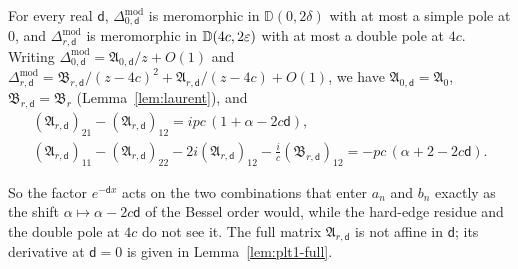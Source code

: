 \begin{lemma}\label{lem:plt1-laurent}
For every real $\mathsf d$, $\Delta^{\mathrm{mod}}_{0,\mathsf d}$ is meromorphic in $\mathbb D(0,2\delta)$ with at most a simple
pole at $0$, and $\Delta^{\mathrm{mod}}_{r,\mathsf d}$ is meromorphic in $\mathbb D(4c,2\varepsilon)$ with at most a double pole at
$4c$. Writing $\Delta^{\mathrm{mod}}_{0,\mathsf d}=\mathfrak A_{0,\mathsf d}/z+O(1)$ and
$\Delta^{\mathrm{mod}}_{r,\mathsf d}=\mathfrak B_{r,\mathsf d}/(z-4c)^2+\mathfrak A_{r,\mathsf d}/(z-4c)+O(1)$, we have
$\mathfrak A_{0,\mathsf d}=\mathfrak A_0$, $\mathfrak B_{r,\mathsf d}=\mathfrak B_r$ (Lemma~\ref{lem:laurent}), and
\begin{equation}\label{eq:plt1-combinations}
\begin{gathered}
  (\mathfrak A_{r,\mathsf d})_{21}-(\mathfrak A_{r,\mathsf d})_{12}=ipc\,(1+\alpha-2c\mathsf d),\\
  (\mathfrak A_{r,\mathsf d})_{11}-(\mathfrak A_{r,\mathsf d})_{22}-2i(\mathfrak A_{r,\mathsf d})_{12}-\frac ic(\mathfrak B_{r,\mathsf d})_{12}
  =-pc\,(\alpha+2-2c\mathsf d).
\end{gathered}
\end{equation}
\end{lemma}

So the factor $e^{-\mathsf dx}$ acts on the two combinations that enter $a_n$ and $b_n$ exactly as the shift
$\alpha\mapsto\alpha-2c\mathsf d$ of the Bessel order would, while the hard-edge residue and the double pole at $4c$ do
not see it. The full matrix $\mathfrak A_{r,\mathsf d}$ is not affine in $\mathsf d$; its derivative at $\mathsf d=0$ is
given in Lemma~\ref{lem:plt1-full}.

